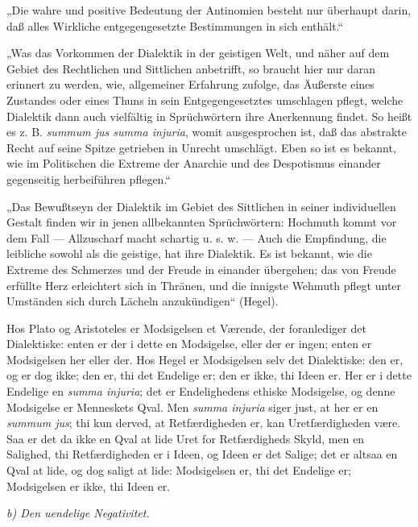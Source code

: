 \documentclass[12pt]{book}
\newcommand{\opage}[1]{\marginnote{\footnotesize\textit{[#1]}}}
\begin{document}
„Die wahre und positive Bedeutung der Antinomien besteht nur überhaupt darin, daß alles Wirkliche
entgegengesetzte Bestimmungen in sich enthält.“

„Was das Vorkommen der Dialektik in der geistigen Welt, und näher auf dem Gebiet des Rechtlichen
und Sittlichen anbetrifft, so braucht hier nur daran erinnert zu werden, wie, allgemeiner
Erfahrung zufolge, das Äußerste eines Zustandes oder eines Thuns in sein Entgegengesetztes
umschlagen pflegt, welche Dialektik dann auch vielfältig in Sprüchwörtern ihre Anerkennung findet.
So heißt es z. B. \textit{summum jus summa injuria}, womit ausgesprochen ist, daß das abstrakte
Recht auf seine Spitze getrieben in Unrecht umschlägt. Eben so ist es bekannt, wie im Politischen
die Extreme der Anarchie und des Despotismus einander gegenseitig herbeiführen pflegen.“

„Das Bewußtseyn der Dialektik im Gebiet des Sittlichen in seiner individuellen Gestalt finden wir
in jenen allbekannten Sprüchwörtern: Hochmuth kommt vor dem Fall — Allzuscharf macht schartig
u. s. w. — Auch die Empfindung, die leibliche sowohl als die geistige, hat ihre Dialektik.
\opage{152} Es ist bekannt, wie die Extreme des Schmerzes und der Freude in einander übergehen; das von Freude
erfüllte Herz erleichtert sich in Thränen, und die innigste Wehmuth pflegt unter Umständen sich
durch Lächeln anzukündigen“ (Hegel).

Hos Plato og Aristoteles er Modsigelsen et Værende, der foranlediger det Dialektiske: enten er der
i dette en Modsigelse, eller der er ingen; enten er Modsigelsen her eller der. Hos Hegel er
Modsigelsen selv det Dialektiske: den er, og er dog ikke; den er, thi det Endelige er; den er
ikke, thi Ideen er. Her er i dette Endelige en \textit{summa injuria}; det er Endelighedens
ethiske Modsigelse, og denne Modsigelse er Menneskets Qval. Men \textit{summa injuria} siger just,
at her er en \textit{summum jus}; thi kun derved, at Retfærdigheden er, kan Uretfærdigheden være.
Saa er det da ikke en Qval at lide Uret for Retfærdigheds Skyld, men en Salighed, thi
Retfærdigheden er i Ideen, og Ideen er det Salige; det er altsaa en Qval at lide, og dog saligt at
lide: Modsigelsen er, thi det Endelige er; Modsigelsen er ikke, thi Ideen er.

\emph{b) Den uendelige Negativitet.}
\end{document}
